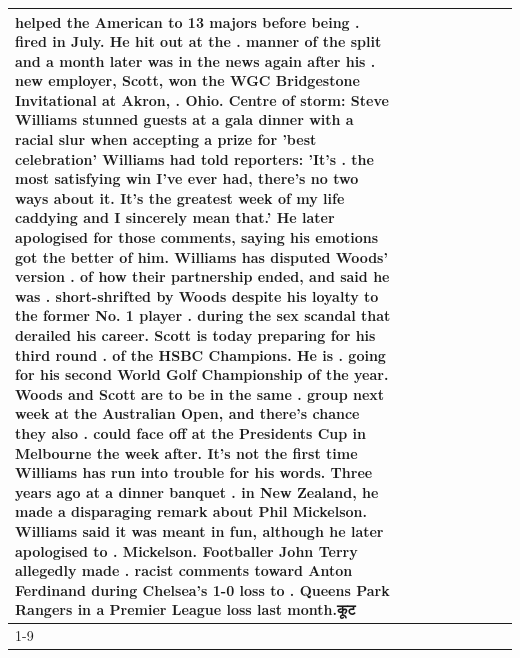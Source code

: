 \begin{table}[H]
\begin{tabular}{lllrlllll}
helped the American to 13 majors before being . fired in July. He hit out at the . manner of the split and a month later was in the news again after his . new employer, Scott, won the WGC Bridgestone Invitational at Akron, . Ohio. Centre of storm: Steve Williams stunned guests at a gala dinner with a racial slur when accepting a prize for 'best celebration' Williams had told reporters: 'It's . the most satisfying win I've ever had, there's no two ways about it. It's the greatest week of my life caddying and I sincerely mean that.' He later apologised for those comments, saying his emotions got the better of him. Williams has disputed Woods' version . of how their partnership ended, and said he was . short-shrifted by Woods despite his loyalty to the former No. 1 player . during the sex scandal that derailed his career. Scott is today preparing for his third round . of the HSBC Champions. He is . going for his second World Golf Championship of the year. Woods and Scott are to be in the same . group next week at the Australian Open, and there's chance they also . could face off at the Presidents Cup in Melbourne the week after. It's not the first time Williams has run into trouble for his words. Three years ago at a dinner banquet . in New Zealand, he made a disparaging remark about Phil Mickelson. Williams said it was meant in fun, although he later apologised to . Mickelson. Footballer John Terry allegedly made . racist comments toward Anton Ferdinand during Chelsea's 1-0 loss to . Queens Park Rangers in a Premier League loss last month.कूट \\
\cline{1-9}

\end{tabular}
\end{table}
